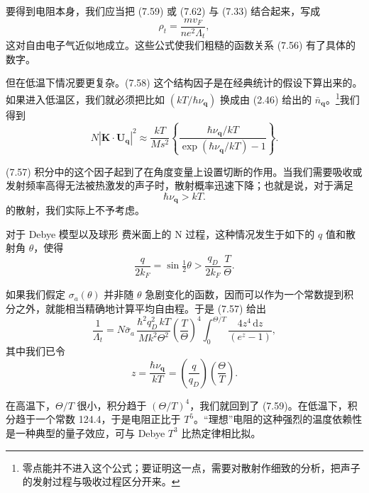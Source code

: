 要得到电阻本身，我们应当把 (7.59) 或 (7.62) 与 (7.33) 结合起来，写成
\begin{equation*}
\rho_{t}=\frac{mv_{F}}{ne^{2}\Lambda_{t}},\tag{7.63}
\end{equation*}
这对自由电子气近似地成立。这些公式使我们粗糙的函数关系 (7.56) 有了具体的数字。

但在低温下情况要更复杂。(7.58) 这个结构因子是在经典统计的假设下算出来的。如果进入低温区，我们就必须把比如 $(kT/\hbar\nu_{\mathbf{q}})$ 换成由 (2.46) 给出的 $\bar{n}_{\mathbf{q}}$。\footnote{零点能并不进入这个公式；要证明这一点，需要对散射作细致的分析，把声子的发射过程与吸收过程区分开来。}我们得到
\begin{equation*}
N|\mathbf{K}\cdot\mathbf{U}_{\mathbf{q}}|^{2}\approx\frac{kT}{Ms^{2}}\left\{\frac{\hbar\nu_{\mathbf{q}}/kT}{\exp(\hbar\nu_{\mathbf{q}}/kT)-1}\right\}.\tag{7.64}
\end{equation*}

(7.57) 积分中的这个因子起到了在角度变量上设置切断的作用。当我们需要吸收或发射频率高得无法被热激发的声子时，散射概率迅速下降；也就是说，对于满足
\begin{equation*}
\hbar\nu_{\mathbf{q}}>kT.\tag{7.65}
\end{equation*}
的散射，我们实际上不予考虑。

对于 Debye 模型以及球形 费米面上的 N 过程，这种情况发生于如下的 $q$ 值和散射角 $\theta$，使得
\begin{equation*}
\frac{q}{2k_{F}}=\sin\tfrac{1}{2}\theta>\frac{q_{D}}{2k_{F}}\,\frac{T}{\Theta}.\tag{7.66}
\end{equation*}

如果我们假定 $\sigma_{a}(\theta)$ 并非随 $\theta$ 急剧变化的函数，因而可以作为一个常数提到积分之外，就能相当精确地计算平均自由程。于是 (7.57) 给出
\begin{equation*}
\frac{1}{\Lambda_{t}}=N\bar{\sigma}_{a}\,\frac{\hbar^{2}q_{D}^{2}\,kT}{Mk^{2}\Theta^{2}}\left(\frac{T}{\Theta}\right)^{4}\int_{0}^{\Theta/T}\frac{4z^{4}\,\mathrm{d}z}{(e^{z}-1)},\tag{7.67}
\end{equation*}
其中我们已令
\begin{equation*}
z=\frac{\hbar\nu_{\mathbf{q}}}{kT}=\left(\frac{q}{q_{D}}\right)\left(\frac{\Theta}{T}\right).\tag{7.68}
\end{equation*}


在高温下，$\Theta/T$ 很小，积分趋于 $(\Theta/T)^{4}$，我们就回到了 (7.59)。在低温下，积分趋于一个常数 124.4，于是电阻正比于 $T^{5}$。“理想”电阻的这种强烈的温度依赖性是一种典型的量子效应，可与 Debye $T^{3}$ 比热定律相比拟。

